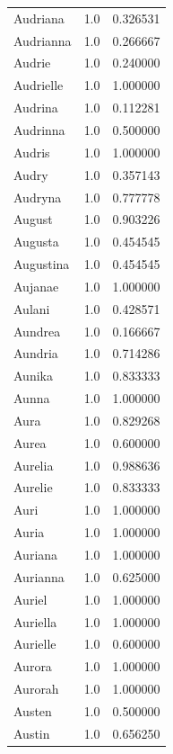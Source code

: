 \documentclass[
  letterpaper,
  DIV=11,
  numbers=noendperiod]{scrreprt}
\begin{document}
\begin{tabular}{lrr}
Audriana        &   1.0 &   0.326531 \\
Audrianna       &   1.0 &   0.266667 \\
Audrie          &   1.0 &   0.240000 \\
Audrielle       &   1.0 &   1.000000 \\
Audrina         &   1.0 &   0.112281 \\
Audrinna        &   1.0 &   0.500000 \\
Audris          &   1.0 &   1.000000 \\
Audry           &   1.0 &   0.357143 \\
Audryna         &   1.0 &   0.777778 \\
August          &   1.0 &   0.903226 \\
Augusta         &   1.0 &   0.454545 \\
Augustina       &   1.0 &   0.454545 \\
Aujanae         &   1.0 &   1.000000 \\
Aulani          &   1.0 &   0.428571 \\
Aundrea         &   1.0 &   0.166667 \\
Aundria         &   1.0 &   0.714286 \\
Aunika          &   1.0 &   0.833333 \\
Aunna           &   1.0 &   1.000000 \\
Aura            &   1.0 &   0.829268 \\
Aurea           &   1.0 &   0.600000 \\
Aurelia         &   1.0 &   0.988636 \\
Aurelie         &   1.0 &   0.833333 \\
Auri            &   1.0 &   1.000000 \\
Auria           &   1.0 &   1.000000 \\
Auriana         &   1.0 &   1.000000 \\
Aurianna        &   1.0 &   0.625000 \\
Auriel          &   1.0 &   1.000000 \\
Auriella        &   1.0 &   1.000000 \\
Aurielle        &   1.0 &   0.600000 \\
Aurora          &   1.0 &   1.000000 \\
Aurorah         &   1.0 &   1.000000 \\
Austen          &   1.0 &   0.500000 \\
Austin          &   1.0 &   0.656250 \\

\end{tabular}
\end{document}
